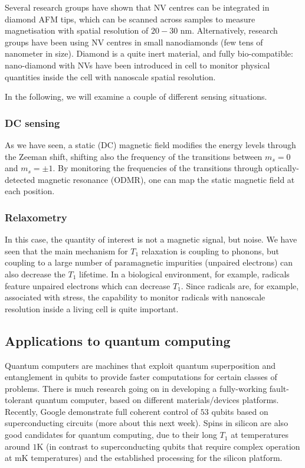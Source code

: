\documentclass[a4paper,11pt]{article}
\begin{document}
Several research groups have shown that NV centres can be integrated in diamond AFM tips, which can be scanned across samples to measure magnetisation with spatial resolution of $20-30$ nm.
\newline Alternatively, research groups have been using NV centres in small nanodiamonds (few tens of nanometer in size). Diamond is a quite inert material, and fully bio-compatible: nano-diamond with NVs have been introduced in cell to monitor physical quantities inside the cell with nanoscale spatial resolution.

In the following, we will examine a couple of different sensing situations.

\subsubsection{DC sensing}
As we have seen, a static (DC) magnetic field modifies the energy levels through the Zeeman shift, shifting also the frequency of the transitions between $m_s = 0$ and $m_s = \pm 1$. By monitoring the frequencies of the transitions through optically-detected magnetic resonance (ODMR), one can map the static magnetic field at each position.

\subsubsection{Relaxometry}
In this case, the quantity of interest is not a magnetic signal, but noise. We have seen that the main mechanism for $T_1$ relaxation is coupling to phonons, but coupling to a large number of paramagnetic impurities (unpaired electrons) can also decrease the $T_1$ lifetime. In a biological environment, for example, radicals feature unpaired electrons which can decrease $T_1$. Since radicals are, for example, associated with stress, the capability to monitor radicals with nanoscale resolution inside a living cell is quite important.

\subsection {Applications to quantum computing}
Quantum computers are machines that exploit quantum superposition and entanglement in qubits to provide faster computations for certain classes of problems.
\newline There is much research going on in developing a fully-working fault-tolerant quantum computer, based on different materials/devices platforms. Recently, Google demonstrate full coherent control of $53$ qubits based on superconducting circuits (more about this next week). Spins in silicon are also good candidates for quantum computing, due to their long $T_1$ at temperatures around $1$K (in contrast to superconducting qubits that require complex operation at mK temperatures) and the established processing for the silicon platform.
\end{document}
